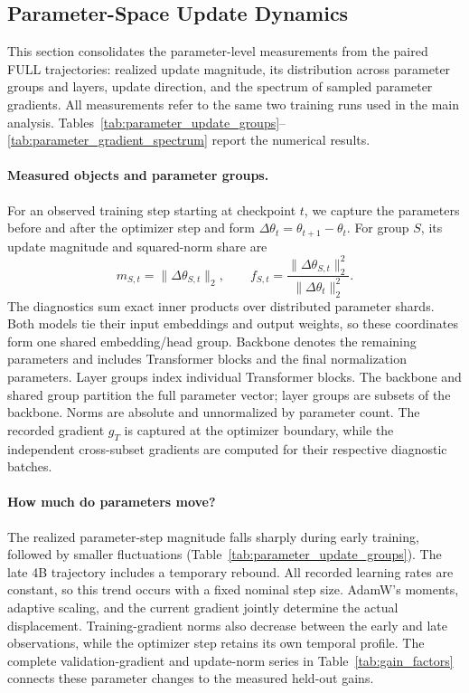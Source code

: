 \clearpage
\makeatletter
\setlength{\@fptop}{0pt}
\makeatother
\subsection{Parameter-Space Update Dynamics}
\label{app:parameter_dynamics}
This section consolidates the parameter-level measurements from the paired FULL trajectories: realized update magnitude, its distribution across parameter groups and layers, update direction, and the spectrum of sampled parameter gradients. All measurements refer to the same two training runs used in the main analysis. Tables~\ref{tab:parameter_update_groups}--\ref{tab:parameter_gradient_spectrum} report the numerical results.

\paragraph{Measured objects and parameter groups.}
For an observed training step starting at checkpoint $t$, we capture the parameters before and after the optimizer step and form $\Delta\theta_t=\theta_{t+1}-\theta_t$. For group $S$, its update magnitude and squared-norm share are
\begin{equation}
 m_{S,t}=\|\Delta\theta_{S,t}\|_2,\qquad
 f_{S,t}=\frac{\|\Delta\theta_{S,t}\|_2^2}{\|\Delta\theta_t\|_2^2}.
\end{equation}
The diagnostics sum exact inner products over distributed parameter shards. Both models tie their input embeddings and output weights, so these coordinates form one shared embedding/head group. Backbone denotes the remaining parameters and includes Transformer blocks and the final normalization parameters. Layer groups index individual Transformer blocks. The backbone and shared group partition the full parameter vector; layer groups are subsets of the backbone. Norms are absolute and unnormalized by parameter count. The recorded gradient $g_T$ is captured at the optimizer boundary, while the independent cross-subset gradients are computed for their respective diagnostic batches.

\paragraph{How much do parameters move?}
The realized parameter-step magnitude falls sharply during early training, followed by smaller fluctuations (Table~\ref{tab:parameter_update_groups}). The late 4B trajectory includes a temporary rebound. All recorded learning rates are constant, so this trend occurs with a fixed nominal step size. AdamW's moments, adaptive scaling, and the current gradient jointly determine the actual displacement. Training-gradient norms also decrease between the early and late observations, while the optimizer step retains its own temporal profile. The complete validation-gradient and update-norm series in Table~\ref{tab:gain_factors} connects these parameter changes to the measured held-out gains.

